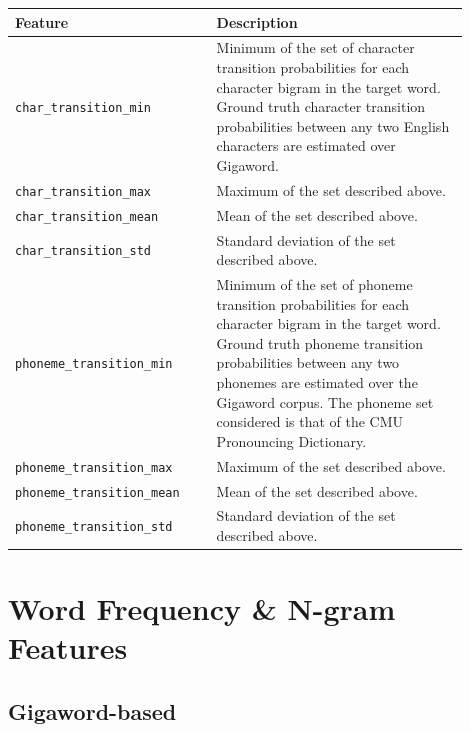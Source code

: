 \documentclass{dcthesis}
\theoremstyle{definition}
\theoremstyle{remark}
\begin{document}
\begin{table}[H]
  \centering
  \begin{tabular}{>{\centering\arraybackslash}p{0.4\linewidth}>{\arraybackslash}p{0.5\linewidth}}
    \textbf{Feature} & \textbf{Description} \\ \hline
    \texttt{char\_transition\_min} & Minimum of the set of character transition probabilities for each character bigram in the target word. Ground truth character transition probabilities between any two English characters are estimated over Gigaword.\\
    \hline 
    \texttt{char\_transition\_max} & Maximum of the set described above.\\
    \hline 
    \texttt{char\_transition\_mean} & Mean of the set described above.\\
    \hline 
    \texttt{char\_transition\_std} & Standard deviation of the set described above.\\
    \hline 
    \texttt{phoneme\_transition\_min} & Minimum of the set of phoneme transition probabilities for each character bigram in the target word. Ground truth phoneme transition probabilities between any two phonemes are estimated over the Gigaword corpus. The phoneme set considered is that of the CMU Pronouncing Dictionary.\tablefootnote{\url{http://www.speech.cs.cmu.edu/cgi-bin/cmudict}}\\
    \hline 
    \texttt{phoneme\_transition\_max} & Maximum of the set described above.\\
    \hline 
    \texttt{phoneme\_transition\_mean} & Mean of the set described above.\\
    \hline 
    \texttt{phoneme\_transition\_std} & Standard deviation of the set described above.\\
  \end{tabular}
  \label{phonetic_features}
\end{table}

\section{Word Frequency \& N-gram Features}

\subsection{Gigaword-based}
\end{document}
